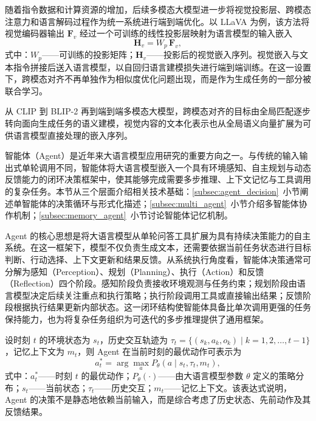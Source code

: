 随着指令数据和计算资源的增加，后续多模态大模型进一步将视觉投影层、跨模态注意力和语言解码过程作为统一系统进行端到端优化\cite{liu2023visual,liu2024improved,zhang2023video}。以 LLaVA\cite{liu2023visual} 为例，该方法将视觉编码器输出 $\mathbf{F}_v$ 经过一个可训练的线性投影层映射为语言模型的输入嵌入
\begin{equation}
\mathbf{H}_v=W_p\,\mathbf{F}_v,
\end{equation}
式中：$W_p$——可训练的投影矩阵；$\mathbf{H}_v$——投影后的视觉嵌入序列。视觉嵌入与文本指令拼接后送入语言模型，以自回归语言建模损失进行端到端训练。在这一设置下，跨模态对齐不再单独作为相似度优化问题出现，而是作为生成任务的一部分被联合学习。

从 CLIP 到 BLIP-2 再到端到端多模态大模型，跨模态对齐的目标由全局匹配逐步转向面向生成任务的语义建模，视觉内容的文本化表示也从全局语义向量扩展为可供语言模型直接处理的嵌入序列。

\label{sec:agent_tech}

智能体（Agent）是近年来大语言模型应用研究的重要方向之一。与传统的输入输出式单轮调用不同，智能体将大语言模型嵌入一个具有环境感知、自主规划与动态反馈能力的闭环决策框架中，使其能够完成需要多步推理、上下文记忆与工具调用的复杂任务\cite{wang2024survey_agent}。本节从三个层面介绍相关技术基础：\ref{subsec:agent_decision}~小节阐述单智能体的决策循环与形式化描述；\ref{subsec:multi_agent}~小节介绍多智能体协作机制；\ref{subsec:memory_agent}~小节讨论智能体记忆机制。

\label{subsec:agent_decision}

Agent 的核心思想是将大语言模型从单轮问答工具扩展为具有持续决策能力的自主系统。在这一框架下，模型不仅负责生成文本，还需要依据当前任务状态进行目标判断、行动选择、上下文更新和结果反馈。从系统执行角度看，智能体决策通常可分解为感知（Perception）、规划（Planning）、执行（Action）和反馈（Reflection）四个阶段\cite{wang2024survey_agent}。感知阶段负责接收环境观测与任务约束；规划阶段由语言模型决定后续关注重点和执行策略；执行阶段调用工具或直接输出结果；反馈阶段根据执行结果更新内部状态。这一闭环结构使智能体具备比单次调用更强的任务保持能力，也为将复杂任务组织为可迭代的多步推理提供了通用框架。

设时刻 $t$ 的环境状态为 $s_t$，历史交互轨迹为 $\tau_t=\{(s_k,a_k,o_k)\mid k=1,2,\ldots,t-1\}$，记忆上下文为 $m_t$，则 Agent 在当前时刻的最优动作可表示为
\begin{equation}
a_t^{*}=\arg\max_{a} P_{\theta}(a\mid s_t,\tau_t,m_t),
\end{equation}
式中：$a_t^{*}$——时刻 $t$ 的最优动作；$P_{\theta}(\cdot)$——由大语言模型参数 $\theta$ 定义的策略分布；$s_t$——当前状态；$\tau_t$——历史交互；$m_t$——记忆上下文。该表达式说明，Agent 的决策不是静态地依赖当前输入，而是综合考虑了历史状态、先前动作及其反馈结果。

